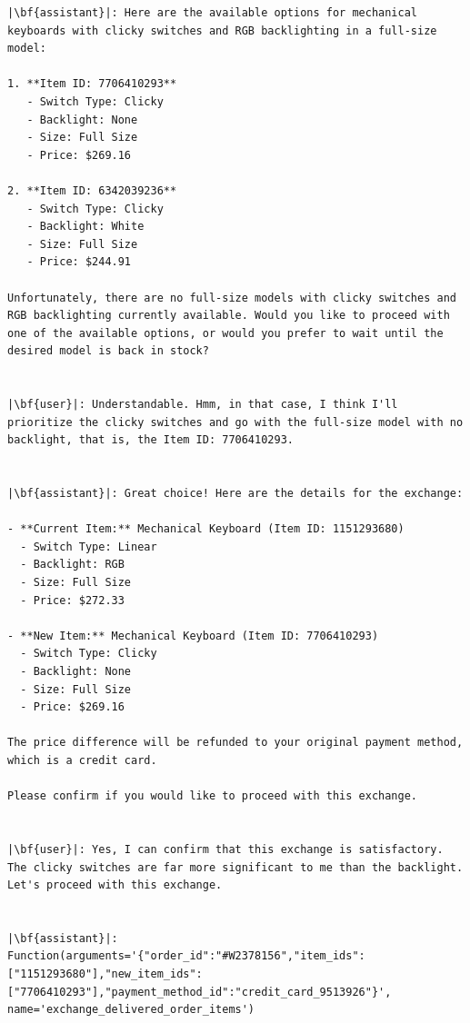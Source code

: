 \begin{longlisting}
\begin{verbatim}
|\bf{assistant}|: Here are the available options for mechanical keyboards with clicky switches and RGB backlighting in a full-size model:

1. **Item ID: 7706410293**
   - Switch Type: Clicky
   - Backlight: None
   - Size: Full Size
   - Price: $269.16

2. **Item ID: 6342039236**
   - Switch Type: Clicky
   - Backlight: White
   - Size: Full Size
   - Price: $244.91

Unfortunately, there are no full-size models with clicky switches and RGB backlighting currently available. Would you like to proceed with one of the available options, or would you prefer to wait until the desired model is back in stock?


|\bf{user}|: Understandable. Hmm, in that case, I think I'll prioritize the clicky switches and go with the full-size model with no backlight, that is, the Item ID: 7706410293.


|\bf{assistant}|: Great choice! Here are the details for the exchange:

- **Current Item:** Mechanical Keyboard (Item ID: 1151293680)
  - Switch Type: Linear
  - Backlight: RGB
  - Size: Full Size
  - Price: $272.33

- **New Item:** Mechanical Keyboard (Item ID: 7706410293)
  - Switch Type: Clicky
  - Backlight: None
  - Size: Full Size
  - Price: $269.16

The price difference will be refunded to your original payment method, which is a credit card.

Please confirm if you would like to proceed with this exchange.


|\bf{user}|: Yes, I can confirm that this exchange is satisfactory. The clicky switches are far more significant to me than the backlight. Let's proceed with this exchange.


|\bf{assistant}|: Function(arguments='{"order_id":"#W2378156","item_ids":["1151293680"],"new_item_ids":["7706410293"],"payment_method_id":"credit_card_9513926"}', name='exchange_delivered_order_items')



\end{verbatim}
\end{longlisting}
